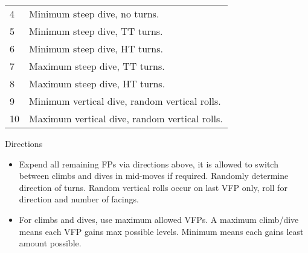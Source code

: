 \begin{onecolumntablefloat}
\begin{onecolumntable}
\begin{tabularx}{\linewidth}{lX}
4   &Minimum steep dive, no turns.\\
5   &Minimum steep dive, TT turns.\\
6   &Minimum steep dive, HT turns.\\
7   &Maximum steep dive, TT turns.\\
8   &Maximum steep dive, HT turns.\\
9   &Minimum vertical dive, random vertical rolls.\\
10  &Maximum vertical dive, random vertical rolls.\\
\bottomrule
\end{tabularx}
\begin{tablenote}{\linewidth}
{\centering Directions\par\smallskip}

\begin{itemize}
    \item Expend all remaining FPs via directions above, it is allowed to switch between climbs and dives in mid-moves if required. Randomly determine direction of turns. Random vertical rolls occur on last VFP only, roll for direction and number of facings.
    \item For climbs and dives, use maximum allowed VFPs. A maximum climb/dive means each VFP gains max possible levels. Minimum means each gains least amount possible.
\end{itemize}
\end{tablenote}

\end{onecolumntable}
\end{onecolumntablefloat}
